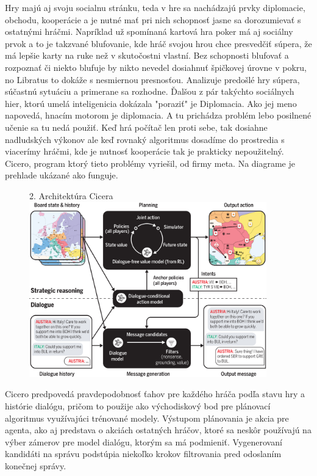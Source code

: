 \documentclass{article}
\begin{document}
Hry majú aj svoju socialnu stránku, teda v hre sa nachádzajú prvky diplomacie, obchodu, kooperácie a je nutné mať pri nich schopnosť jasne sa dorozumievať s ostatnými hráčmi. Napríklad už spomínaná kartová hra poker má aj sociálny prvok a to je takzvané blufovanie, kde hráč svojou hrou chce presvedčiť súpera, že má lepšie karty na ruke než v skutočostni vlastní. Bez schopnosti blufovať a rozpoznať či niekto blufuje by nikto nevedel dosiahnuť špičkovej úrovne v pokru, no Libratus to dokáže s nesmiernou presnosťou. Analizuje predošlé hry súpera, súčastnú sytuáciu a primerane sa rozhodne. Ďalšou z pár takýchto sociálnych hier, ktorú umelá inteligenicia dokázala "poraziť" je Diplomacia\cite{doi:10.1126/science.ade9097}. Ako jej meno napovedá, hnacím motorom je diplomacia. A tu prichádza problém lebo posilnené učenie sa tu nedá použiť. Keď hrá počítač len proti sebe, tak dosiahne nadludských výkonov ale keď rovnaký algoritmus dosadíme do prostredia s viacerímy hráčmi, kde je nutnosť kooperácie tak je prakticky nepoužitelný. Cicero, program ktorý tieto problémy vyriešil, od firmy meta. Na diagrame je prehlade ukázané ako funguje.

\begin{figure}{2. Architektúra Cicera\cite{doi:10.1126/science.ade9097}}
\centering
\includegraphics[width=103mm]{science.ade9097-f1.jpg}
\end{figure}
Cicero predpovedá pravdepodobnosť ťahov pre každého hráča podľa stavu hry a histórie dialógu, pričom to použije ako východiskový bod pre plánovací algoritmus využívajúci trénované  modely. Výstupom plánovania je akcia pre agenta, ako aj predstava o akciách ostatných hráčov, ktoré sa neskôr používajú na výber zámerov pre model dialógu, ktorým sa má podmieniť. Vygenerovaní kandidáti na správu podstúpia niekoľko krokov filtrovania pred odoslaním konečnej správy.
\end{document}
